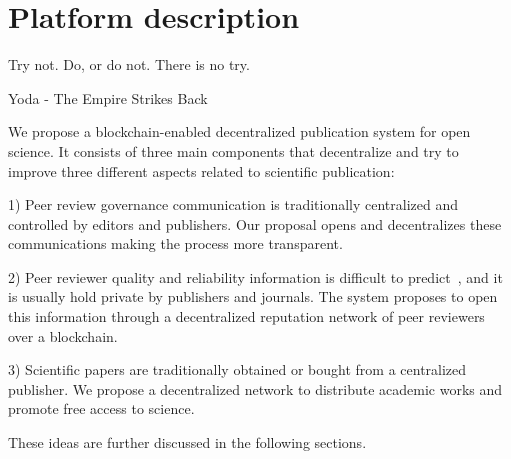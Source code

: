 \chapter{Platform description}

\begin{FraseCelebre}
  \begin{Frase}
    Try not. Do, or do not. There is no try.
  \end{Frase}
  \begin{Fuente}
    Yoda - The Empire Strikes Back
  \end{Fuente}
\end{FraseCelebre}

We propose a blockchain-enabled decentralized publication system for open
science. It consists of three main components that decentralize and try to
improve three different aspects related to scientific publication:

1) Peer review governance communication is traditionally centralized and
controlled by editors and publishers. Our proposal opens and decentralizes these
communications making the process more transparent.

2) Peer reviewer quality and reliability information is difficult to
predict~\cite{callaham_relationship_2007}, and it is usually hold private by
publishers and journals. The system proposes to open this information through a
decentralized reputation network of peer reviewers over a blockchain.

3) Scientific papers are traditionally obtained or bought from a centralized
publisher. We propose a decentralized network to distribute academic works and
promote free access to science.

These ideas are further discussed in the following sections.




